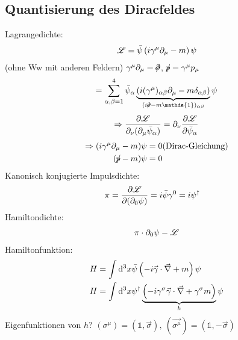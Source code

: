 \subsection{Quantisierung des Diracfeldes} 
	
Lagrangedichte:
	\begin{align*}
		\mathscr{L} = \bar{\psi} \left(
			i \gamma^\mu \partial_\mu - m
		\right) \psi 
	\end{align*}	
(ohne Ww mit anderen Feldern) $\gamma^\mu \partial_\mu = /\!\!\!\!\!\; {\partial}$, $/\!\!\!\!\!\; {p} = \gamma^\mu p_\mu$
	\begin{align*}
		= \sum_{\alpha,\beta = 1}^{4} \bar{\psi}_\alpha 
		\underbrace{\left(
			i (\gamma^\mu)_{\alpha \beta} \partial_\mu - m \delta_{\alpha \beta} 
		\right)}_{\mathclap{(i \durch{\partial} - m \mathds{1})_{\alpha \beta}}} \psi 
	\end{align*}
	\begin{align*}
		\Rightarrow \frac{\partial \mathscr{L}}{\partial_\nu (\partial_\mu \bar{\psi}_\alpha)}
		= \partial_\nu \frac{\partial \mathscr{L}}{\partial \bar{\psi}_\alpha}
	\end{align*}
	\begin{align*}
		\Rightarrow (i\gamma^\mu \partial_\mu - m) \psi &= 0  \text{(Dirac-Gleichung)} \\
		(/\!\!\!\!\!\; {p} - m) \psi &= 0
	\end{align*}
Kanonisch konjugierte Impulsdichte:
	\begin{align*}
		\pi &= \frac{\partial \mathscr{L}}{\partial(\partial_0 \psi)} = i \bar{\psi} \gamma^0 
		= i \psi^\dagger 
	\end{align*}
Hamiltondichte:
	\begin{align*}
		\pi \cdot \partial_0 \psi - \mathscr{L} 
	\end{align*}
Hamiltonfunktion:
	\begin{align*}
		H &= \int \diff^3 x \bar{\psi} 
		\left(
			- i \vec{\gamma} \cdot \vec{\nabla} + m
		\right) \psi \\
		H &= \int \diff^3 x \psi^\dagger 
		\underbrace{\left(
			- i \gamma^\sigma \vec{\gamma} \cdot \vec{\nabla} + \gamma^\sigma m
		\right)}_{\mathclap{h}} \psi
	\end{align*}
Eigenfunktionen von $h$? $(\sigma^\mu) = (\mathds{1}, \vec{\sigma}),~ (\vec{\sigma^\mu}) = (\mathds{1}, -\vec{\sigma})$
